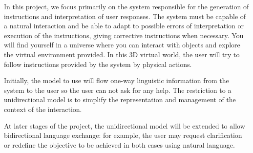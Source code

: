 
% 

In this project, we focus primarily on the system responsible for the
generation of instructions and interpretation of user responses. The system must
be capable of
a natural interaction and be able to adapt to possible errors of interpretation
or execution of the instructions, giving corrective instructions when necessary.
You will find yourself in a universe where you can interact with objects and
explore the virtual environment provided. In this 3D virtual world, the user
will try to follow instructions provided by the system by physical actions.


Initially, the model to use will flow one-way linguistic information from the
system to the user so the user can not ask for any help. The restriction to a
unidirectional model is to simplify the representation and management of the
context of the interaction.


At later stages of the project, the unidirectional model will be extended to
allow bidirectional language exchange: for example, the user may request
clarification or redefine the objective to be achieved in both cases using
natural language.

